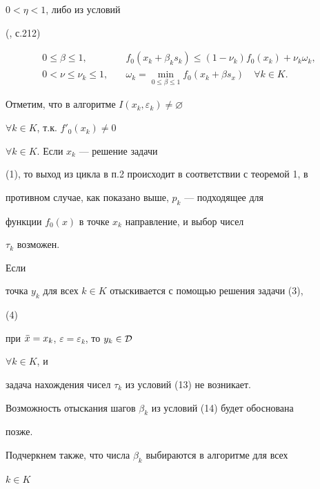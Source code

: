 \begin{itemize}
$0<\eta<1$, либо из условий


(\cite{Kar}, с.212)


\begin{equation}


\begin{split}


0\le\beta\le 1,\quad &f_0(x_k+\beta_ks_k)\le(1-\nu_k)f_0(x_k)+


\nu_k\omega_k,\\


0<\nu\le\nu_k\le 1,\quad &\omega_k=\min_{0\le\beta\le 1}


f_0(x_k+\beta s_x)\quad \forall k\in K.


\end{split}


\end{equation}


\end{itemize}





Отметим, что в алгоритме $I(x_k,\varepsilon_k)\ne\varnothing$


$\forall k\in K$, т.к. $f'_0(x_k)\ne 0$


$\forall k\in K$. Если $x_k$ --- решение задачи


(1), то выход из цикла в п.2 происходит в соответствии с теоремой 1, в


противном случае, как показано выше, $p_k$ --- подходящее для


функции $f_0(x)$ в точке $x_k$ направление, и выбор чисел


$\tau_k$ возможен.


Если


точка $y_k$ для всех $k\in K$ отыскивается с помощью решения задачи (3),


(4)


при $\Bar x=x_k$, $\varepsilon=\varepsilon_k$, то $y_k\in\cal D$


$\forall k\in K$, и


задача нахождения чисел $\tau_k$ из условий (13) не возникает.





Возможность отыскания шагов $\beta_k$ из условий (14) будет обоснована


позже.


Подчеркнем также, что числа $\beta_k$ выбираются в алгоритме для всех


$k\in K$


